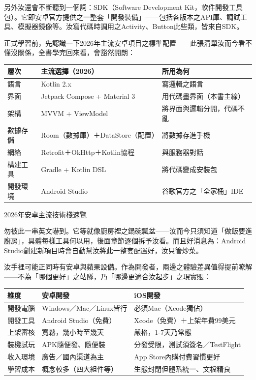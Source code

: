 另外汝還會不斷聽到一個詞：SDK（Software Development Kit，軟件開發工具包）。它即安卓官方提供之一整套「開發裝備」——包括各版本之API庫、調試工具、模擬器鏡像等。汝寫代碼時調用之Activity、Button此些類，皆來自SDK。


正式學習前，先認識一下2026年主流安卓項目之標準配置——此張清單汝而今看不懂沒關係，全書學完回來看，會豁然開朗：

\begin{center}
\begin{tabularx}{\linewidth}{|X|X|X|}
\hline
\textbf{層次} & \textbf{主流選擇（2026）} & \textbf{所用為何} \tabularnewline
\hline
語言 & Kotlin 2.x & 寫邏輯之語言 \tabularnewline
界面 & Jetpack Compose + Material 3 & 用代碼畫界面（本書主線） \tabularnewline
架構 & MVVM + ViewModel & 將界面與邏輯分開，代碼不亂 \tabularnewline
數據存儲 & Room（數據庫）＋DataStore（配置） & 將數據存進手機 \tabularnewline
網絡 & Retrofit＋OkHttp＋Kotlin協程 & 與服務器對話 \tabularnewline
構建工具 & Gradle + Kotlin DSL & 將代碼變成安裝包 \tabularnewline
開發環境 & Android Studio & 谷歌官方之「全家桶」IDE \tabularnewline
\hline
\end{tabularx}
\end{center}

\begin{center}\small\color{gray}2026年安卓主流技術棧速覽\end{center}

勿被此一串英文嚇到。它等就像廚房裡之鍋碗瓢盆——汝而今只須知道「做飯要進廚房」，具體每樣工具何以用，後面章節逐個拆予汝看。而且好消息為：Android Studio創建新項目時會自動幫汝將此一整套配置好，汝只管炒菜。


汝手裡可能正同時有安卓與蘋果設備。作為開發者，兩邊之體驗差異值得提前瞭解——不為「哪個更好」之站隊，乃「哪邊更適合汝起步」之現實賬：

\begin{center}
\begin{tabularx}{\linewidth}{|X|X|X|}
\hline
\textbf{維度} & \textbf{安卓開發} & \textbf{iOS開發} \tabularnewline
\hline
開發電腦 & Windows／Mac／Linux皆行 & 必須Mac（Xcode獨佔） \tabularnewline
開發工具 & Android Studio（免費） & Xcode（免費）＋上架年費99美元 \tabularnewline
上架審核 & 寬鬆，幾小時至幾天 & 嚴格，1-7天乃常態 \tabularnewline
裝機試玩 & APK隨便發、隨便裝 & 分發受限，測試須簽名／TestFlight \tabularnewline
收入環境 & 廣告／國內渠道為主 & App Store內購付費習慣更好 \tabularnewline
學習成本 & 概念較多（四大組件等） & 生態封閉但體系統一、文檔精良 \tabularnewline
\hline
\end{tabularx}
\end{center}

